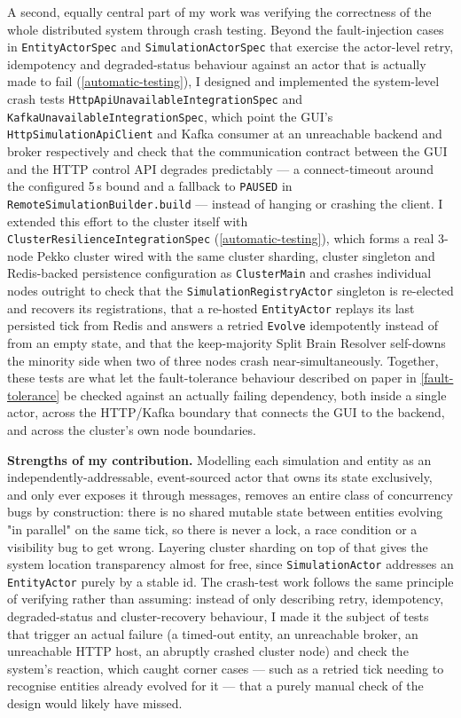 \documentclass{scrreprt}
\begin{document}
A second, equally central part of my work was verifying the correctness of the whole distributed
system through crash testing. Beyond the fault-injection cases in \texttt{EntityActorSpec} and
\texttt{SimulationActorSpec} that exercise the actor-level retry, idempotency and
degraded-status behaviour against an actor that is actually made to fail
(\cref{automatic-testing}), I designed and implemented the system-level crash tests
\texttt{HttpApiUnavailableIntegrationSpec} and \texttt{KafkaUnavailableIntegrationSpec}, which
point the GUI's \texttt{HttpSimulationApiClient} and Kafka consumer at an unreachable backend and
broker respectively and check that the communication contract between the GUI and the HTTP
control API degrades predictably --- a connect-timeout around the configured 5\,s bound and a
fallback to \texttt{PAUSED} in \texttt{RemoteSimulationBuilder.build} --- instead of hanging or
crashing the client. I extended this effort to the cluster itself with
\texttt{ClusterResilienceIntegrationSpec} (\cref{automatic-testing}), which forms a real 3-node
Pekko cluster wired with the same cluster sharding, cluster singleton and Redis-backed
persistence configuration as \texttt{ClusterMain} and crashes individual nodes outright to check
that the \texttt{SimulationRegistryActor} singleton is re-elected and recovers its registrations,
that a re-hosted \texttt{EntityActor} replays its last persisted tick from Redis and answers a
retried \texttt{Evolve} idempotently instead of from an empty state, and that the keep-majority
Split Brain Resolver self-downs the minority side when two of three nodes crash
near-simultaneously. Together, these tests are what let the fault-tolerance behaviour described
on paper in \cref{fault-tolerance} be checked against an actually failing dependency, both inside
a single actor, across the HTTP/Kafka boundary that connects the GUI to the backend, and across
the cluster's own node boundaries.

\textbf{Strengths of my contribution.} Modelling each simulation and entity as an
independently-addressable, event-sourced actor that owns its state exclusively, and only ever
exposes it through messages, removes an entire class of concurrency bugs by construction: there
is no shared mutable state between entities evolving "in parallel" on the same tick, so there is
never a lock, a race condition or a visibility bug to get wrong. Layering cluster sharding on top
of that gives the system location transparency almost for free, since \texttt{SimulationActor}
addresses an \texttt{EntityActor} purely by a stable id. The crash-test work follows the same
principle of verifying rather than assuming: instead of only describing retry, idempotency,
degraded-status and cluster-recovery behaviour, I made it the subject of tests that trigger an
actual failure (a timed-out entity, an unreachable broker, an unreachable HTTP host, an abruptly
crashed cluster node) and check the system's reaction, which caught corner cases --- such as a
retried tick needing to recognise entities
already evolved for it --- that a purely manual check of the design would likely have missed.
\end{document}
